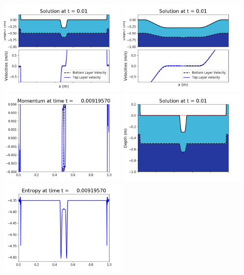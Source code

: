 \documentclass[11pt]{article}
\begin{document}
\vskip 10pt 
\includegraphics[width=0.475\textwidth]{frame0022fig1001.png}
\includegraphics[width=0.475\textwidth]{frame0022fig1002.png}
\vskip 10pt 
\includegraphics[width=0.475\textwidth]{frame0022fig1003.png}
\includegraphics[width=0.475\textwidth]{frame0022fig1006.png}
\vskip 10pt 
\includegraphics[width=0.475\textwidth]{frame0022fig1007.png}
\end{document}
